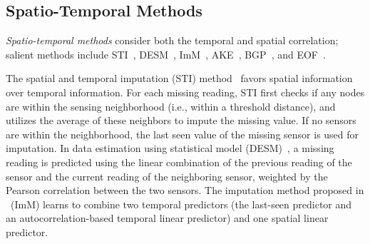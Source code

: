 

\subsection{Spatio-Temporal Methods}   \label{sec:rw_spatial_temporal}
{\em Spatio-temporal methods} consider both the
temporal and spatial correlation; salient methods include
STI~\cite{Jian-Zhong:STI}, DESM~\cite{li2008data}, ImM~\cite{Lim:robust},
AKE~\cite{pan2010k}, BGP~\cite{osborne2012real}, and EOF~\cite{beckers2003eof, kondrashov2006spatio}.

The spatial and temporal imputation (STI) method~\cite{li2008spatial}
favors spatial information over temporal information.  For each
missing reading, STI first checks if any nodes are within the sensing
neighborhood (i.e., within a threshold distance), and utilizes the average of these neighbors to impute the
missing value. If no sensors are within the neighborhood, the last
seen value of the missing sensor is used for imputation.
In data estimation using statistical model (DESM)~\cite{li2008data}, a
missing reading is predicted using the linear combination of the
previous reading of the sensor and the current reading of the
neighboring sensor, weighted by the Pearson correlation between the
two sensors.  The imputation method proposed in \cite{Lim:robust}~(ImM) learns to combine two temporal predictors 
(the last-seen predictor and an autocorrelation-based temporal linear predictor) and one spatial 
linear predictor.


